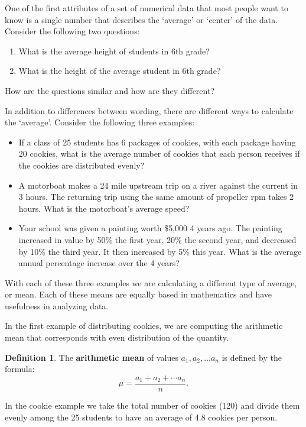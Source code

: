 \documentclass[
]{book}
\providecommand{\tightlist}{%
  \setlength{\itemsep}{0pt}\setlength{\parskip}{0pt}}
\theoremstyle{definition}
\newtheorem{definition}{Definition}[chapter]
\theoremstyle{definition}
\theoremstyle{definition}
\theoremstyle{definition}
\theoremstyle{remark}
\begin{document}
One of the first attributes of a set of numerical data that most people want to know is a single number that describes the `average' or `center' of the data. Consider the following two questions:

\begin{enumerate}
\def\labelenumi{\arabic{enumi}.}
\tightlist
\item
  What is the average height of students in 6th grade?
\item
  What is the height of the average student in 6th grade?
\end{enumerate}

How are the questions similar and how are they different?

In addition to differences between wording, there are different ways to calculate the `average'. Consider the following three examples:

\begin{itemize}
\item
  If a class of 25 students has 6 packages of cookies, with each package having 20 cookies, what is the average number of cookies that each person receives if the cookies are distributed evenly?
\item
  A motorboat makes a 24 mile upstream trip on a river against the current in 3 hours. The returning trip using the same amount of propeller rpm takes 2 hours. What is the motorboat's average speed?
\item
  Your school was given a painting worth \$5,000 4 years ago. The painting increased in value by 50\% the first year, 20\% the second year, and decreased by 10\% the third year. It then increased by 5\% this year. What is the average annual percentage increase over the 4 years?
\end{itemize}

With each of these three examples we are calculating a different type of average, or mean. Each of these means are equally based in mathematics and have usefulness in analyzing data.

In the first example of distributing cookies, we are computing the arithmetic mean that corresponds with even distribution of the quantity.

\begin{definition}
The \textbf{arithmetic mean} of values \(a_1, a_2, \ldots a_n\) is defined by the formula:
\[\mu = \frac{a_1 + a_2 + \cdots a_n}{n}.\]
\end{definition}

In the cookie example we take the total number of cookies (120) and divide them evenly among the 25 students to have an average of 4.8 cookies per person.
\end{document}
